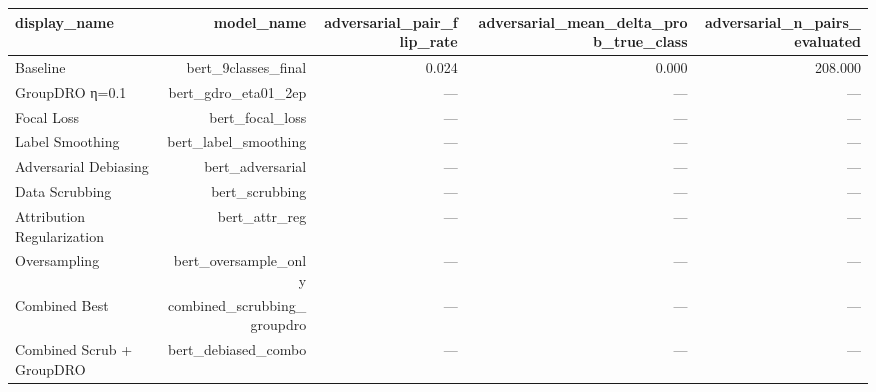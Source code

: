 \begin{tabular}{lrrrr}
\toprule
\textbf{display\_name} & \textbf{model\_name} & \textbf{adversarial\_pair\_flip\_rate} & \textbf{adversarial\_mean\_delta\_prob\_true\_class} & \textbf{adversarial\_n\_pairs\_evaluated} \\
\midrule
Baseline & bert\_9classes\_final & 0.024 & 0.000 & 208.000 \\
GroupDRO η=0.1 & bert\_gdro\_eta01\_2ep & --- & --- & --- \\
Focal Loss & bert\_focal\_loss & --- & --- & --- \\
Label Smoothing & bert\_label\_smoothing & --- & --- & --- \\
Adversarial Debiasing & bert\_adversarial & --- & --- & --- \\
Data Scrubbing & bert\_scrubbing & --- & --- & --- \\
Attribution Regularization & bert\_attr\_reg & --- & --- & --- \\
Oversampling & bert\_oversample\_only & --- & --- & --- \\
Combined Best & combined\_scrubbing\_groupdro & --- & --- & --- \\
Combined Scrub + GroupDRO & bert\_debiased\_combo & --- & --- & --- \\
\bottomrule
\end{tabular}
